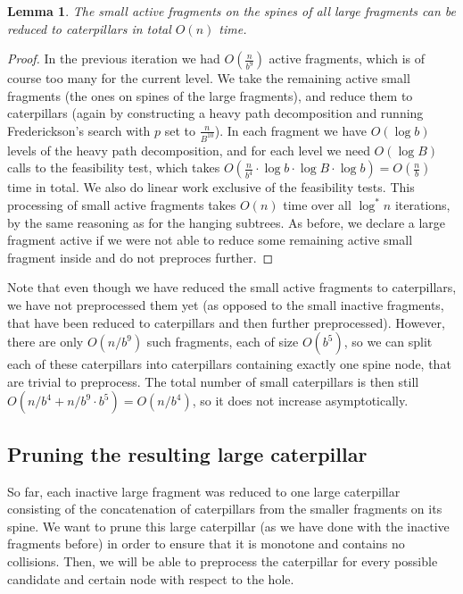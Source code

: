 \documentclass[11pt,a4paper]{article}
\newtheorem{lemma}{Lemma}
\theoremstyle{definition}
\theoremstyle{remark}
\begin{document}
\begin{lemma}\label{lemma2}
	The small active fragments on the spines of all large fragments can be reduced to caterpillars in total $O(n)$ time. 
\end{lemma}
\begin{proof}

In the previous iteration we had $O(\frac{n}{b^9})$ active fragments, which is of course
too many for the current level. We take the remaining active small fragments (the ones on spines of the large 
fragments), and reduce them to caterpillars (again by constructing a heavy path decomposition and running
Frederickson's search with $p$ set to $\frac{n}{B^{10}}$). In each fragment we have $O(\log b)$ levels of the heavy
path decomposition, and for each level we need $O(\log B)$ calls to the feasibility test, which takes
$O(\frac{n}{b^4} \cdot \log b \cdot \log B \cdot \log b) = O(\frac{n}{b})$ time in total. We also do linear
work exclusive of the feasibility tests. This processing of small active fragments takes $O(n)$ time over all
$\log^*n$ iterations, by the same reasoning as for the hanging subtrees.
As before, we declare a large fragment active if we were not able to reduce some remaining active small
fragment inside and do not preproces further.
\end{proof}

Note that even though we have reduced the small active fragments to caterpillars, we have not preprocessed them yet
(as opposed to the small inactive fragments, that have been reduced to caterpillars and then further preprocessed).
However, there are only $O(n/b^{9})$ such fragments, each of size $O(b^{5})$, so we can split each
of these caterpillars into caterpillars containing exactly one spine node, that are trivial to preprocess.
The total number of small caterpillars is then still $O(n/b^{4}+n/b^{9}\cdot b^{5})=O(n/b^{4})$,
so it does not increase asymptotically.

\subsection{Pruning the resulting large caterpillar}\label{section:lemma3}
So far, each inactive large fragment was reduced to one large caterpillar consisting of the concatenation of caterpillars from the smaller fragments on its spine. We want
to prune this large caterpillar (as we have done with the inactive fragments before) in order to ensure
that it is monotone and contains no collisions.   Then, we will
be able to preprocess the caterpillar for every possible candidate and certain node with respect to the hole.
\end{document}
